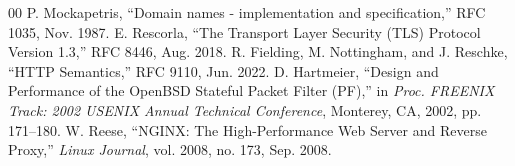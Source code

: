\documentclass[conference]{IEEEtran}
\begin{document}
\begin{thebibliography}{00}
 P. Mockapetris, ``Domain names - implementation and specification,'' RFC 1035, Nov. 1987.
 E. Rescorla, ``The Transport Layer Security (TLS) Protocol Version 1.3,'' RFC 8446, Aug. 2018.
 R. Fielding, M. Nottingham, and J. Reschke, ``HTTP Semantics,'' RFC 9110, Jun. 2022.
 D. Hartmeier, ``Design and Performance of the OpenBSD Stateful Packet Filter (PF),'' in \textit{Proc. FREENIX Track: 2002 USENIX Annual Technical Conference}, Monterey, CA, 2002, pp. 171--180.
 W. Reese, ``NGINX: The High-Performance Web Server and Reverse Proxy,'' \textit{Linux Journal}, vol. 2008, no. 173, Sep. 2008.
\end{thebibliography}
\end{document}

